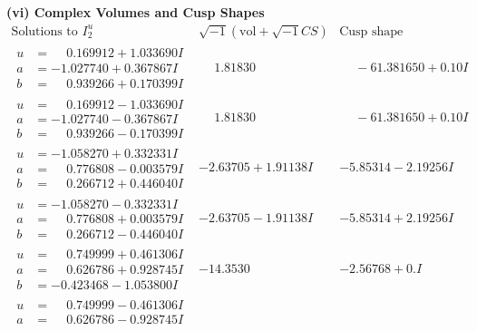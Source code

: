 \documentclass[1p]{elsarticle_modified}
\theoremstyle{definition}
\newcommand{\I}{\sqrt{-1}}
\begin{document}
\newpage\flushleft \textbf{(vi) Complex Volumes and Cusp Shapes}
$$\begin{array}{c|c|c}  
\text{Solutions to }I^u_{2}& \I (\text{vol} + \sqrt{-1}CS) & \text{Cusp shape}\\
 \hline 
\begin{aligned}
u &= \phantom{-}0.169912 + 1.033690 I \\
a &= -1.027740 + 0.367867 I \\
b &= \phantom{-}0.939266 + 0.170399 I\end{aligned}
 & \phantom{-}1.81830\phantom{ +0.000000I} & \phantom{-}                -6
1.381650 + 0. 10   I\phantom{ +0.000000I} \\ \hline\begin{aligned}
u &= \phantom{-}0.169912 - 1.033690 I \\
a &= -1.027740 - 0.367867 I \\
b &= \phantom{-}0.939266 - 0.170399 I\end{aligned}
 & \phantom{-}1.81830\phantom{ +0.000000I} & \phantom{-}                -6
1.381650 + 0. 10   I\phantom{ +0.000000I} \\ \hline\begin{aligned}
u &= -1.058270 + 0.332331 I \\
a &= \phantom{-}0.776808 - 0.003579 I \\
b &= \phantom{-}0.266712 + 0.446040 I\end{aligned}
 & -2.63705 + 1.91138 I & -5.85314 - 2.19256 I \\ \hline\begin{aligned}
u &= -1.058270 - 0.332331 I \\
a &= \phantom{-}0.776808 + 0.003579 I \\
b &= \phantom{-}0.266712 - 0.446040 I\end{aligned}
 & -2.63705 - 1.91138 I & -5.85314 + 2.19256 I \\ \hline\begin{aligned}
u &= \phantom{-}0.749999 + 0.461306 I \\
a &= \phantom{-}0.626786 + 0.928745 I \\
b &= -0.423468 - 1.053800 I\end{aligned}
 & -14.3530\phantom{ +0.000000I} & -2.56768 + 0. I\phantom{ +0.000000I} \\ \hline\begin{aligned}
u &= \phantom{-}0.749999 - 0.461306 I \\
a &= \phantom{-}0.626786 - 0.928745 I \\

\end{aligned}
\end{array}$$
\end{document}
